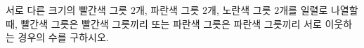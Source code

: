 \hspace*{2mm}\begin{minipage}[t]{\dimexpr\linewidth-2mm\relax}\vspace{0pt}
서로 다른 크기의 빨간색 그릇 $2$개, 파란색 그릇 $2$개, 노란색 그릇 $2$개를 일렬로 나열할 때, 빨간색 그릇은 빨간색 그릇끼리 또는 파란색 그릇은 파란색 그릇끼리 서로 이웃하는 경우의 수를 구하시오.\end{minipage}
